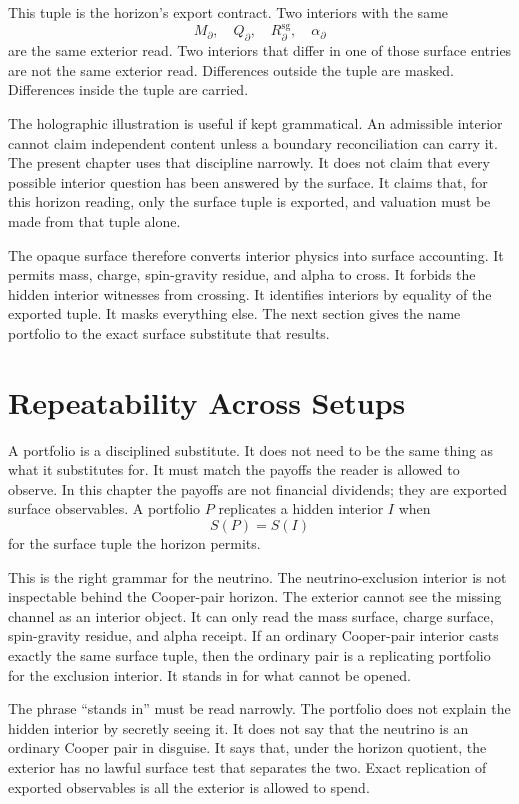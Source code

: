 This tuple is the horizon's export contract. Two interiors with the same
\[
  M_{\partial},\quad Q_{\partial},\quad
  R^{\mathrm{sg}}_{\partial},\quad \alpha_{\partial}
\]
are the same exterior read. Two interiors that differ in one of those
surface entries are not the same exterior read. Differences outside the
tuple are masked. Differences inside the tuple are carried.

The holographic illustration is useful if kept grammatical. An admissible
interior cannot claim independent content unless a boundary reconciliation
can carry it. The present chapter uses that discipline narrowly. It does
not claim that every possible interior question has been answered by the
surface. It claims that, for this horizon reading, only the surface tuple is
exported, and valuation must be made from that tuple alone.

The opaque surface therefore converts interior physics into surface
accounting. It permits mass, charge, spin-gravity residue, and alpha to
cross. It forbids the hidden interior witnesses from crossing. It identifies
interiors by equality of the exported tuple. It masks everything else. The
next section gives the name portfolio to the exact surface substitute that
results.

\section{Repeatability Across Setups}

A portfolio is a disciplined substitute. It does not need to be the same
thing as what it substitutes for. It must match the payoffs the reader is
allowed to observe. In this chapter the payoffs are not financial
dividends; they are exported surface observables. A portfolio \(P\)
replicates a hidden interior \(I\) when
\[
  S(P)=S(I)
\]
for the surface tuple the horizon permits.

This is the right grammar for the neutrino. The neutrino-exclusion interior
is not inspectable behind the Cooper-pair horizon. The exterior cannot see
the missing channel as an interior object. It can only read the mass
surface, charge surface, spin-gravity residue, and alpha receipt. If an
ordinary Cooper-pair interior casts exactly the same surface tuple, then the
ordinary pair is a replicating portfolio for the exclusion interior. It
stands in for what cannot be opened.

The phrase ``stands in'' must be read narrowly. The portfolio does not
explain the hidden interior by secretly seeing it. It does not say that the
neutrino is an ordinary Cooper pair in disguise. It says that, under the
horizon quotient, the exterior has no lawful surface test that separates the
two. Exact replication of exported observables is all the exterior is
allowed to spend.

